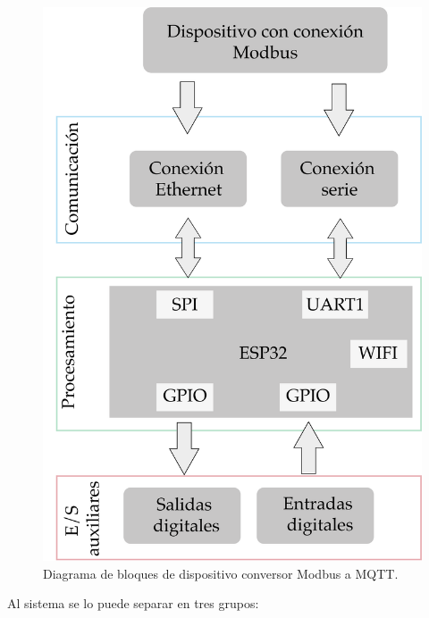 \begin{figure}[htpb]
	\centering
	\includegraphics[scale=.35]{./Figures/diagrama_dispositivo.png}
	\caption[Diagrama de bloques de dispositivo conversor ]{Diagrama de bloques de dispositivo conversor Modbus a MQTT.}
	\label{fig:dev-conv}
\end{figure}

Al sistema se lo puede separar en tres grupos:

